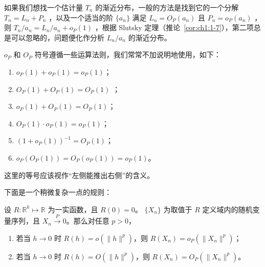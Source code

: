 如果我们想找一个估计量 $T_n$ 的渐近分布，一般的方法是找到它的一个分解 $T_n=L_n+P_n$ ，以及一个适当的阶 $\{a_n\}$ 满足 $L_n=O_P(a_n)$ 且 $P_n=o_P(a_n)$ ，则 $T_n/a_n=L_n/a_n+o_P(1)$ ，根据 Slutsky 定理（推论~\ref{cor:ch1:1-7}），第二项总是可以忽略的，问题便化作分析 $L_n/a_n$ 的渐近分布。

$o_P$ 和 $O_P$ 符号遵循一些运算法则，我们常常不加说明地使用，如下：

\begin{enumerate}
\def\labelenumi{\arabic{enumi}.}
\tightlist
\item
  $o_P(1) + o_P(1) = o_P(1)$；
\item
  $O_P(1) + O_P(1) = O_P(1)$ ；
\item
  $o_P(1) + O_P(1) = O_P(1)$；
\item
  $O_P(1) \cdot o_P(1) = o_P(1)$；
\item
  $(1 + o_P(1))^{-1} = O_P(1)$；
\item
  $o_P(O_P(1)) = O_P(o_P(1)) = o_P(1)$。
\end{enumerate}

这里的等号应该视作``左侧能推出右侧''的含义。

下面是一个稍微复杂一点的规则：

\begin{lemma}\label{lem:ch1:stochastic-plugin}

\label{lem:ch1:1-9}

设 $R: \mathbb{R}^k \mapsto \mathbb{R}$ 为一实函数，且 $R(0) = 0$。 $\{X_n\}$ 为取值于 $R$ 定义域内的随机变量序列，且 $X_n\overset P\to 0$。那么对任意 $p > 0$，

\begin{enumerate}
\def\labelenumi{\arabic{enumi}.}
\tightlist
\item
  若当 $h \to 0$ 时 $R(h) = o(\|h\|^p)$，则 $R(X_n) = o_P(\|X_n\|^p)$；
\item
  若当 $h \to 0$ 时 $R(h) = O(\|h\|^p)$，则 $R(X_n) = O_P(\|X_n\|^p)$。
\end{enumerate}

\end{lemma}

